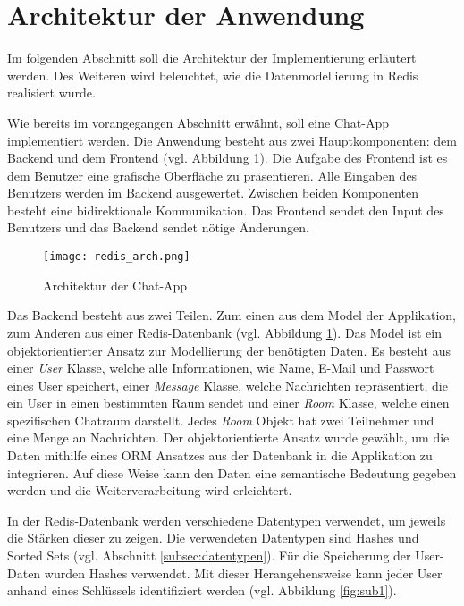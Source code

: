 
\section{Architektur der Anwendung}
Im folgenden Abschnitt soll die Architektur der Implementierung erläutert werden. Des Weiteren wird beleuchtet, wie die Datenmodellierung in \acs{Redis} realisiert wurde.

Wie bereits im vorangegangen Abschnitt erwähnt, soll eine Chat-App implementiert werden. Die Anwendung besteht aus zwei Hauptkomponenten: dem Backend und dem Frontend (vgl. Abbildung \ref{fig:arch}). Die Aufgabe des Frontend ist es dem Benutzer eine grafische Oberfläche zu präsentieren. Alle Eingaben des Benutzers werden im Backend ausgewertet. Zwischen beiden Komponenten besteht eine bidirektionale Kommunikation. Das Frontend sendet den Input des Benutzers und das Backend sendet nötige Änderungen.
\begin{figure}[h]
	\centering
	\texttt{[image: redis\_arch.png]}
	\caption{Architektur der Chat-App}
	\label{fig:arch}
\end{figure}

Das Backend besteht aus zwei Teilen. Zum einen aus dem Model der Applikation, zum Anderen aus einer \acs{Redis}-Datenbank (vgl. Abbildung \ref{fig:arch}). Das Model ist ein objektorientierter Ansatz zur Modellierung der benötigten Daten. Es besteht aus einer \textit{User} Klasse, welche alle Informationen, wie Name, E-Mail und Passwort eines User speichert, einer \textit{Message} Klasse, welche Nachrichten repräsentiert, die ein User in einen bestimmten Raum sendet und einer \textit{Room} Klasse, welche einen spezifischen Chatraum darstellt. Jedes \textit{Room} Objekt hat zwei Teilnehmer und eine Menge an Nachrichten. Der objektorientierte Ansatz wurde gewählt, um die Daten mithilfe eines \acs{ORM} Ansatzes aus der Datenbank in die Applikation zu integrieren. Auf diese Weise kann den Daten eine semantische Bedeutung gegeben werden und die Weiterverarbeitung wird erleichtert.

In der \acs{Redis}-Datenbank werden verschiedene Datentypen verwendet, um jeweils die Stärken dieser zu zeigen. Die verwendeten Datentypen sind Hashes und Sorted Sets (vgl. Abschnitt \ref{subsec:datentypen}). Für die Speicherung der User-Daten wurden Hashes verwendet. Mit dieser Herangehensweise kann jeder User anhand eines Schlüssels identifiziert werden (vgl. Abbildung \ref{fig:sub1}).

